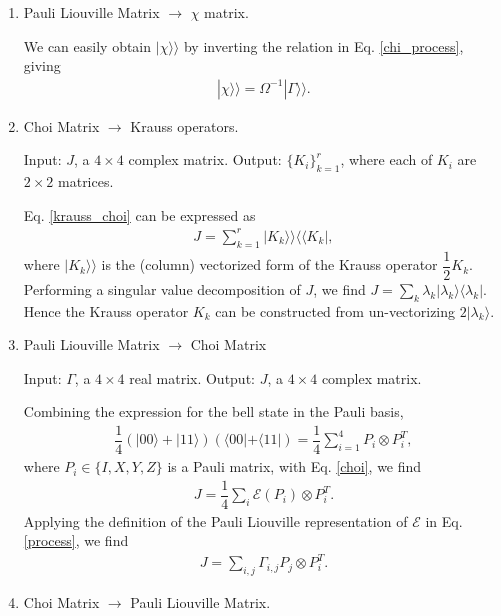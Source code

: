 \documentclass[12pt]{article}
\def\cE{\mathcal{E}}
\begin{document}
\begin{enumerate}
\item Pauli Liouville Matrix $\rightarrow$ $\chi$ matrix.

We can easily obtain $|\chi\rangle\rangle$ by inverting the relation in Eq. \ref{chi_process}, giving
\begin{gather}
|\chi\rangle\rangle = \Omega^{-1}|\Gamma\rangle\rangle \label{process_chi} .
\end{gather}

\item Choi Matrix $\rightarrow$ Krauss operators.

Input: $J$, a $4 \times 4$ complex matrix.
Output: $\{K_{i}\}_{k=1}^{r}$, where each of $K_{i}$ are $2 \times 2$ matrices.

Eq. \ref{krauss_choi} can be expressed as
\begin{gather}
J = \sum_{k = 1}^{r}|K_{k}\rangle\rangle\langle\langle K_{k}| \label{choi_krauss},
\end{gather}
where $|K_{k}\rangle\rangle$ is the (column) vectorized form of the Krauss operator $\dfrac{1}{2}K_{k}$. Performing a singular value decomposition of $J$, we find $J = \sum_{k}\lambda_{k}|\lambda_{k}\rangle\langle\lambda_{k}|$. Hence the Krauss operator $K_{k}$ can be constructed from un-vectorizing $2|\lambda_{k}\rangle$.

\item Pauli Liouville Matrix $\rightarrow$ Choi Matrix

Input: $\Gamma$, a $4 \times 4$ real matrix.
Output: $J$, a $4 \times 4$ complex matrix.

Combining the expression for the bell state in the Pauli basis,
\begin{gather*}
\dfrac{1}{4}(|00\rangle + |11\rangle)(\langle00| + \langle11|) = \dfrac{1}{4}\sum_{i = 1}^{4}P_{i} \otimes P^{T}_{i},
\end{gather*}
where $P_{i} \in \{I, X, Y, Z\}$ is a Pauli matrix, with Eq. \ref{choi}, we find
\begin{gather*}
J = \dfrac{1}{4}\sum_{i}\cE(P_{i})\otimes P^{T}_{i} .
\end{gather*}
Applying the definition of the Pauli Liouville representation of $\cE$ in Eq. \ref{process}, we find
\begin{gather}
J = \sum_{i,j}\Gamma_{i,j}P_{j} \otimes P^{T}_{i} \label{process_choi} .
\end{gather}

\item Choi Matrix $\rightarrow$ Pauli Liouville Matrix.


\end{enumerate}
\end{document}
